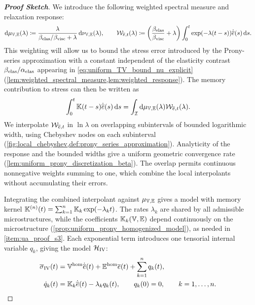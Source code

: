 \documentclass[3p, 12pt, preprint]{elsarticle}
\begin{document}
\begin{proof}[\bf Proof Sketch]
{We introduce the following weighted spectral measure and relaxation response:
\begin{align*}
\mathrm d\mu_{\mathbb{V},\mathbb{E}}(\lambda)\coloneqq\frac{\lambda}{\beta_{\rm elas}/\beta_{\rm visc}+\lambda}\,\mathrm d\nu_{\mathbb{V},\mathbb{E}}(\lambda),\qquad{\mathcal{W}}_{\overline e,t}(\lambda)\coloneqq\left(\frac{\beta_{\rm elas}}{\beta_{\rm visc}}+\lambda\right)\int_0^t\exp(-\lambda(t-s))\dot{\overline e}(s)\,\mathrm ds.
\end{align*}
This weighting will allow us to bound the stress error introduced by the Prony-series approximation with a constant independent of the elasticity contrast $\beta_{\rm elas}/\alpha_{\rm elas}$ appearing in \cref{eq:uniform_TV_bound_nu_explicit} (\cref{lem:weighted_spectral_measure,lem:weighted_response}). The memory contribution to stress can then be written as
\begin{equation}\label{eq:weighted_kernel_representation}
\int_0^t\mathbb{K}(t-s)\dot{\overline e}(s)\,\mathrm ds
=\int_{{\mathcal{I}}}\mathrm d\mu_{\mathbb{V},\mathbb{E}}(\lambda){\mathcal{W}}_{\overline e,t}(\lambda).
\end{equation}
We interpolate ${\mathcal{W}}_{\overline e,t}$ in $\ln\lambda$ on overlapping subintervals of bounded logarithmic width, using Chebyshev nodes on each subinterval (\cref{fig:local_chebyshev,def:prony_series_approximation}). Analyticity of the response and the bounded widths give a uniform geometric convergence rate (\cref{lem:uniform_prony_discretization_beta}). The overlap permits continuous nonnegative weights summing to one, which combine the local interpolants without accumulating their errors.

Integrating the combined interpolant against $\mu_{\mathbb{V},\mathbb{E}}$ gives a model with memory kernel $\mathbb{K}^{(n)}(t)=\sum_{k=1}^n\mathbb{K}_k\exp(-\lambda_kt)$. The rates $\lambda_k$ are shared by all admissible microstructures, while the coefficients $\mathbb{K}_k(\mathbb{V},\mathbb{E})$ depend continuously on the microstructure (\cref{prop:uniform_prony_homogenized_model}), as needed in \ref{item:ua_proof_s3}. Each exponential term introduces one tensorial internal variable $q_k$, giving the model ${\mathcal{H}}_{\rm IV}$:
\begin{subequations}\label{eqns:prony_internal_varaible_model}
\begin{align}
    \overline\sigma_{\rm IV}(t)&=\mathbb{V}^{\rm hom}\dot{\overline e}(t)+\mathbb{E}^{\rm hom}\overline e(t)+\sum_{k=1}^n q_k(t),\\
    \dot q_k(t)&=\mathbb{K}_k\dot{\overline e}(t)-\lambda_kq_k(t),\qquad q_k(0)=0,\qquad k=1,\dots,n.
\end{align}
\end{subequations}

}
\end{proof}
\end{document}
